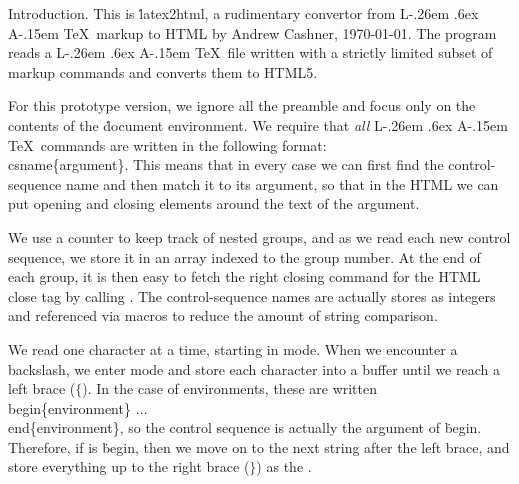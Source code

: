 


\def\LaTeX{L\kern -.26em \raise .6ex \hbox{\sevenrm A}\kern -.15em \TeX}


Introduction.
This is \.{latex2html}, a rudimentary convertor from \LaTeX\ markup to HTML by
Andrew Cashner, \today.
The program reads a \LaTeX\ file written with a strictly limited subset of
markup commands and converts them to HTML5.

For this prototype version, we ignore all the preamble and focus only on the
contents of the \.{document} environment.  We require that {\it all\/} \LaTeX\
commands are written in the following format: \.{\\csname\{argument\}}.  This
means that in every case we can first find the control-sequence name and then
match it to its argument, so that in the HTML we can put opening and closing
elements around the text of the argument.

We use a  counter to keep track of nested groups, and as we read
each new
control sequence, we store it in an array  indexed to the
group
number.  At the end of each group, it is then easy to fetch the right closing
command for the HTML close tag by calling \PB{\\{csnames}[\\{group}]}.  The
control-sequence names are actually stores as integers and referenced via
macros
to reduce the amount of string comparison.

We read one character at a time, starting in  mode.  When we
encounter a
backslash, we enter  mode and store each character into a \PB{%
\\{csnames}}
buffer until we reach a left brace ($\lbrace$).  In the case of environments,
these are written \.{\\begin\{environment\}} $\dots$ \.{\\end\{environment\}},
so the control sequence is actually the argument of \.{begin}.  Therefore, if
\PB{\\{csnames}} is \.{begin}, then we move on to the next string after the
left
brace, and store everything up to the right brace ($\rbrace$) as the
\PB{\\{csnames}}.


